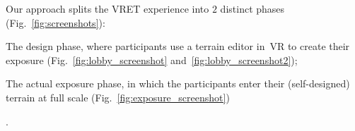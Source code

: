 

Our approach splits the \ac{VRET} experience into $2$ distinct phases (Fig.~\ref{fig:screenshots}):
\begin{enumerate*}
    \item The design phase, where participants use a terrain editor in~\ac{VR} to create their exposure (Fig.~\ref{fig:lobby_screenshot} and~\ref{fig:lobby_screenshot2});
    \item The actual exposure phase, in which the participants enter their (self-designed) terrain at full scale (Fig.~\ref{fig:exposure_screenshot})
\end{enumerate*}.

